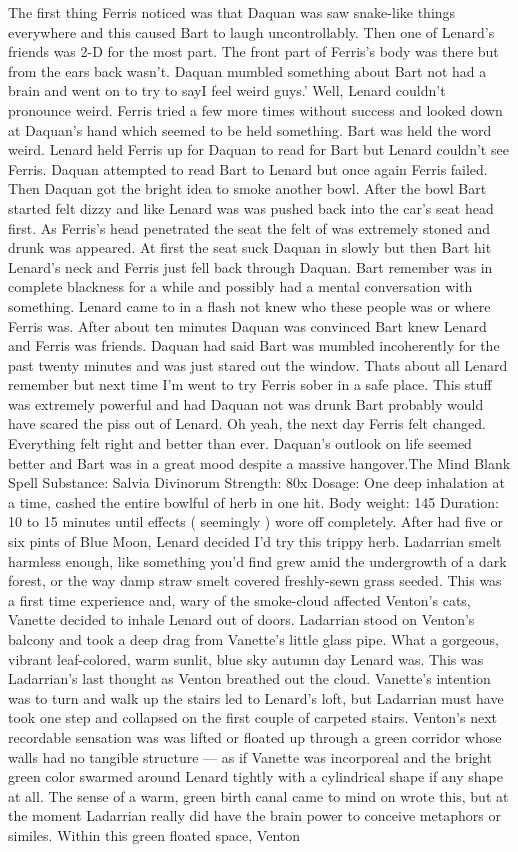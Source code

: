 \documentclass[12pt]{book}
\begin{document}
The first thing Ferris noticed was that Daquan was saw snake-like things everywhere and this caused Bart to laugh uncontrollably. Then one of Lenard's friends was 2-D for the most part. The front part of Ferris's body was there but from the ears back wasn't. Daquan mumbled something about Bart not had a brain and went on to try to sayI feel weird guys.' Well, Lenard couldn't pronounce weird. Ferris tried a few more times without success and looked down at Daquan's hand which seemed to be held something. Bart was held the word weird. Lenard held Ferris up for Daquan to read for Bart but Lenard couldn't see Ferris. Daquan attempted to read Bart to Lenard but once again Ferris failed. Then Daquan got the bright idea to smoke another bowl. After the bowl Bart started felt dizzy and like Lenard was was pushed back into the car's seat head first. As Ferris's head penetrated the seat the felt of was extremely stoned and drunk was appeared. At first the seat suck Daquan in slowly but then Bart hit Lenard's neck and Ferris just fell back through Daquan. Bart remember was in complete blackness for a while and possibly had a mental conversation with something. Lenard came to in a flash not knew who these people was or where Ferris was. After about ten minutes Daquan was convinced Bart knew Lenard and Ferris was friends. Daquan had said Bart was mumbled incoherently for the past twenty minutes and was just stared out the window. Thats about all Lenard remember but next time I'm went to try Ferris sober in a safe place. This stuff was extremely powerful and had Daquan not was drunk Bart probably would have scared the piss out of Lenard. Oh yeah, the next day Ferris felt changed. Everything felt right and better than ever. Daquan's outlook on life seemed better and Bart was in a great mood despite a massive hangover.The Mind Blank Spell Substance: Salvia Divinorum Strength: 80x Dosage: One deep inhalation at a time, cashed the entire bowlful of herb in one hit. Body weight: 145 Duration: 10 to 15 minutes until effects ( seemingly ) wore off completely. After had five or six pints of Blue Moon, Lenard decided I'd try this trippy herb. Ladarrian smelt harmless enough, like something you'd find grew amid the undergrowth of a dark forest, or the way damp straw smelt covered freshly-sewn grass seeded. This was a first time experience and, wary of the smoke-cloud affected Venton's cats, Vanette decided to inhale Lenard out of doors. Ladarrian stood on Venton's balcony and took a deep drag from Vanette's little glass pipe. What a gorgeous, vibrant leaf-colored, warm sunlit, blue sky autumn day Lenard was. This was Ladarrian's last thought as Venton breathed out the cloud. Vanette's intention was to turn and walk up the stairs led to Lenard's loft, but Ladarrian must have took one step and collapsed on the first couple of carpeted stairs. Venton's next recordable sensation was was lifted or floated up through a green corridor whose walls had no tangible structure --- as if Vanette was incorporeal and the bright green color swarmed around Lenard tightly with a cylindrical shape if any shape at all. The sense of a warm, green birth canal came to mind on wrote this, but at the moment Ladarrian really did have the brain power to conceive metaphors or similes. Within this green floated space, Venton 
\end{document}
